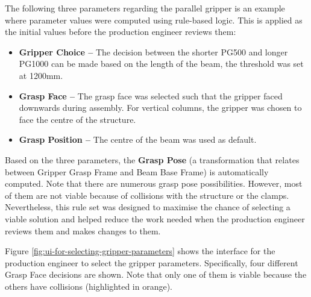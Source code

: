 The following three parameters regarding the parallel gripper is an example where parameter values were computed using rule-based logic. This is applied as the initial values before the production engineer reviews them:

\begin{itemize}
	\item \textbf{Gripper Choice --} The decision between the shorter PG500 and longer PG1000 can be made based on the length of the beam, the threshold was set at 1200mm.

	\item \textbf{Grasp Face --} The grasp face was selected such that the gripper faced downwards during assembly. For vertical columns, the gripper was chosen to face the centre of the structure.

	\item \textbf{Grasp Position --} The centre of the beam was used as default.

\end{itemize}
Based on the three parameters, the \textbf{Grasp Pose} (a transformation that relates between Gripper Grasp Frame and Beam Base Frame) is automatically computed. Note that there are numerous grasp pose possibilities. However, most of them are not viable because of collisions with the structure or the clamps. Nevertheless, this rule set was designed to maximise the chance of selecting a viable solution and helped reduce the work needed when the production engineer reviews them and makes changes to them.

Figure \ref{fig:ui-for-selecting-gripper-parameters} shows the interface for the production engineer to select the gripper parameters. Specifically, four different Grasp Face decisions are shown. Note that only one of them is viable because the others have collisions (highlighted in orange).


